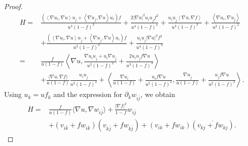 \documentclass{amsart}
\theoremstyle{definition}
\theoremstyle{remark}
\numberwithin{equation}{section}
\begin{document}
\begin{proof}
\[\begin{aligned}
        H =&\frac{
          \left(
            \left\langle\nabla u_i, \nabla u\right\rangle u_{\bar{j}}+\left\langle\nabla u_{\bar{j}}, \nabla u\right\rangle u_i
          \right)f
        }{u^3(1-f)^3}
          +\frac{2|\nabla u|^2 u_i u_{\bar{j}} f^2}{u^4(1-f)^4} +\frac{u_i u_{\bar{j}}\left\langle\nabla u, \nabla f\right\rangle}{u^3(1-f)^3}
          +\frac{\left\langle\nabla u_i, \nabla u_{\bar{j}}\right\rangle}{u^2(1-f)^2} \\
        & +\frac{
          \left(
            \left\langle\nabla u_i, \nabla u\right\rangle u_{\bar{j}}+\left\langle\nabla u_{\bar{j}}, \nabla u\right\rangle u_i
          \right)f
        }{u^3(1-f)^3}
          +\frac{u_i u_{\bar{j}} | \nabla u |^2 f^2}{u^4(1-f)^4} \\
        =& \frac{f}{u(1-f)}
          \left\langle
            \nabla u, \frac{\nabla u_i u_{\bar{j}}+u_i \nabla u_{\bar j}}{u^2(1-f)^2}
          +\frac{2 u_i u_{\bar{j}} f\nabla u }{u^3(1-f)^3}
          \right\rangle\\
        & + \frac{\langle\nabla u,\nabla f\rangle}{u(1-f)}\frac{u_i u_{\bar{j}}}{u^{2}(1-f)^{2}}
          +\left\langle
            \frac{\nabla u_i}{u(1-f)}
            +\frac{u_{i}f\nabla u}{u^{2}(1-f)^{2}}, \frac{\nabla u_{\bar{j}}}{u(1-f)}
            +\frac{u_{\bar{j}}f \nabla u}{u^{2}(1-f)^2}
            \right\rangle.
      \end{aligned}
    \]
  Using $u_k = uf_k$ and the expression for $\partial_k w_{i \bar{j}}$, we obtain 
  \[
  \begin{aligned}
    H= & \frac{f}{u(1-f)}\langle\nabla u, \nabla w_{i \bar{j}}\rangle
      +\frac{|\nabla f|^2}{1-f} w_{i \bar{j}} \\
    & +\left(v_{i \bar{k}}+f w_{i \bar{k}}\right)\left(v_{k \bar{j}} + f w_{k \bar{j}}\right)
      +\left(v_{i k}+f w_{i k}\right)\left(\overline{v_{k j}+f w_{k j}}\right). 
  \end{aligned}
  \]
\end{proof}
\end{document}
